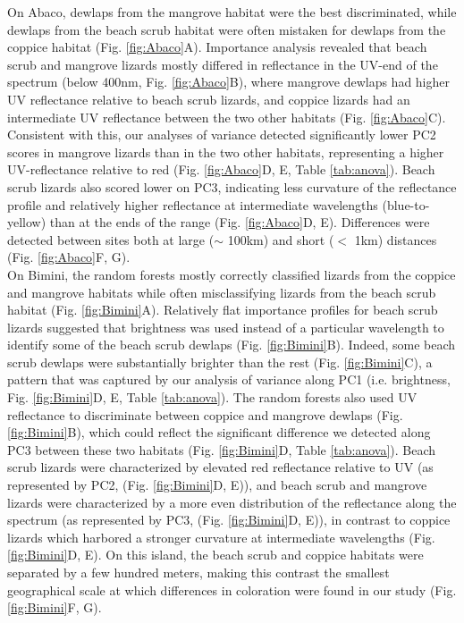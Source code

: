 On Abaco, dewlaps from the mangrove habitat were the best discriminated, while dewlaps from the beach scrub habitat were often mistaken for dewlaps from the coppice habitat (Fig. \ref{fig:Abaco}A). Importance analysis revealed that beach scrub and mangrove lizards mostly differed in reflectance in the UV-end of the spectrum (below 400nm, Fig. \ref{fig:Abaco}B), where mangrove dewlaps had higher UV reflectance relative to beach scrub lizards, and coppice lizards had an intermediate UV reflectance between the two other habitats (Fig. \ref{fig:Abaco}C). Consistent with this, our analyses of variance detected significantly lower PC2 scores in mangrove lizards than in the two other habitats, representing a higher UV-reflectance relative to red (Fig. \ref{fig:Abaco}D, E, Table \ref{tab:anova}). Beach scrub lizards also scored lower on PC3, indicating less curvature of the reflectance profile and relatively higher reflectance at intermediate wavelengths (blue-to-yellow) than at the ends of the range (Fig. \ref{fig:Abaco}D, E). Differences were detected between sites both at large ($\sim$ 100km) and short ($<$ 1km) distances (Fig. \ref{fig:Abaco}F, G).\\

On Bimini, the random forests mostly correctly classified lizards from the coppice and mangrove habitats while often misclassifying lizards from the beach scrub habitat (Fig. \ref{fig:Bimini}A). Relatively flat importance profiles for beach scrub lizards suggested that brightness was used instead of a particular wavelength to identify some of the beach scrub dewlaps (Fig. \ref{fig:Bimini}B). Indeed, some beach scrub dewlaps were substantially brighter than the rest (Fig. \ref{fig:Bimini}C), a pattern that was captured by our analysis of variance along PC1 (i.e. brightness, Fig. \ref{fig:Bimini}D, E, Table \ref{tab:anova}). The random forests also used UV reflectance to discriminate between coppice and mangrove dewlaps (Fig. \ref{fig:Bimini}B), which could reflect the significant difference we detected along PC3 between these two habitats (Fig. \ref{fig:Bimini}D, Table \ref{tab:anova}). Beach scrub lizards were characterized by elevated red reflectance relative to UV (as represented by PC2, (Fig. \ref{fig:Bimini}D, E)), and beach scrub and mangrove lizards were characterized by a more even distribution of the reflectance along the spectrum (as represented by PC3, (Fig. \ref{fig:Bimini}D, E)), in contrast to coppice lizards which harbored a stronger curvature at intermediate wavelengths (Fig. \ref{fig:Bimini}D, E). On this island, the beach scrub and coppice habitats were separated by a few hundred meters, making this contrast the smallest geographical scale at which differences in coloration were found in our study (Fig. \ref{fig:Bimini}F, G).\\

